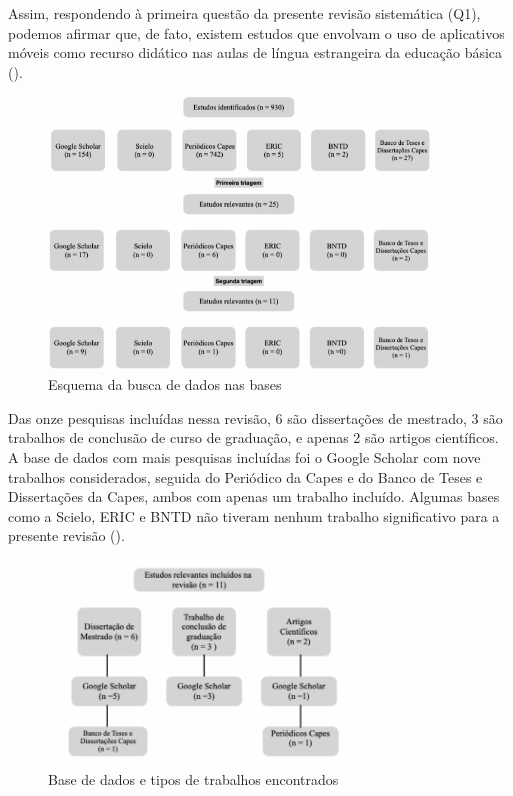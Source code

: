 \documentclass{textolivre}
\begin{document}
Assim, respondendo à primeira questão da presente revisão sistemática (Q1), podemos afirmar que, de fato, existem  estudos que envolvam o uso de aplicativos móveis como recurso didático nas aulas de língua estrangeira da educação básica (). 

\begin{figure}[htbp]
 \centering
 \includegraphics[width=0.9\textwidth]{fig1.png}
 \caption{Esquema da busca de dados nas bases}
 \label{fig1}
\end{figure}

Das onze pesquisas incluídas nessa revisão, 6 são dissertações de mestrado, 3 são trabalhos de conclusão de curso de graduação, e apenas 2 são artigos científicos. A base de dados com mais pesquisas incluídas foi o Google Scholar com nove trabalhos considerados, seguida do Periódico da Capes e do Banco de Teses e Dissertações da Capes, ambos com apenas um trabalho incluído. Algumas bases como a Scielo, ERIC e BNTD não tiveram nenhum trabalho significativo para a presente revisão (). 

\begin{figure}[htbp]
 \centering
 \includegraphics[width=0.75\textwidth]{fig2.png}
 \caption{Base de dados e tipos de trabalhos encontrados}
 \label{fig2}
\end{figure}
\end{document}
